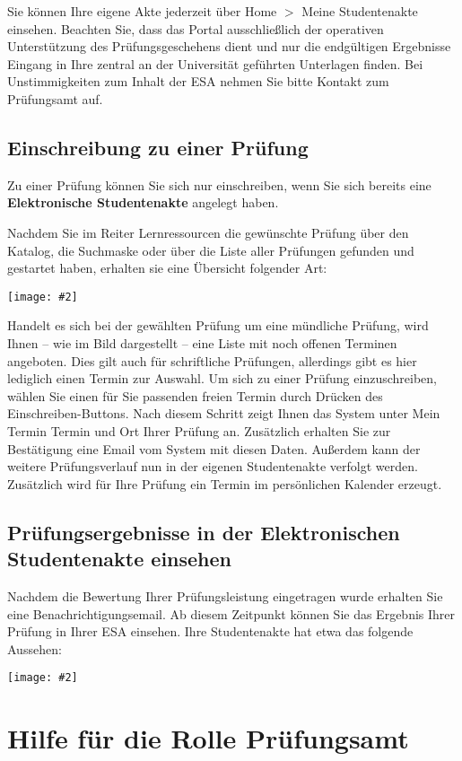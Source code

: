 \documentclass[a4paper,11pt]{article}
\newcommand{\bild}[2]{
    \begin{center}\texttt{[image: \#2]}\end{center}
}
\newcommand{\knopf}[1]{{\sc #1}}
\begin{document}
Sie können Ihre eigene Akte jederzeit über \knopf{Home $>$ Meine Studentenakte}
einsehen. Beachten Sie, dass das Portal ausschließlich der operativen
Unterstützung des Prüfungsgeschehens dient und nur die endgültigen Ergebnisse
Eingang in Ihre zentral an der Universität geführten Unterlagen finden. Bei
Unstimmigkeiten zum Inhalt der ESA nehmen Sie bitte Kontakt zum Prüfungsamt
auf.

\subsection{Einschreibung zu einer Prüfung}

Zu einer Prüfung können Sie sich nur einschreiben, wenn Sie sich bereits eine
{\bf Elektronische Studentenakte} angelegt haben.

Nachdem Sie im Reiter \knopf{Lernressourcen} die gewünschte Prüfung über den
Katalog, die Suchmaske oder über die Liste aller Prüfungen gefunden und
gestartet haben, erhalten sie eine Übersicht folgender Art:

\bild{.9}{Pruefung-Einschreiben}

Handelt es sich bei der gewählten Prüfung um eine mündliche Prüfung, wird
Ihnen -- wie im Bild dargestellt -- eine Liste mit noch offenen Terminen
angeboten.  Dies gilt auch für schriftliche Prüfungen, allerdings gibt es hier
lediglich einen Termin zur Auswahl. Um sich zu einer Prüfung einzuschreiben,
wählen Sie einen für Sie passenden freien Termin durch Drücken des
\knopf{Einschreiben}-Buttons. Nach diesem Schritt zeigt Ihnen das System unter
\knopf{Mein Termin} Termin und Ort Ihrer Prüfung an. Zusätzlich erhalten Sie
zur Bestätigung eine Email vom System mit diesen Daten. Außerdem kann der
weitere Prüfungsverlauf nun in der eigenen Studentenakte verfolgt werden.
Zusätzlich wird für Ihre Prüfung ein Termin im persönlichen Kalender erzeugt.
 
\subsection{Prüfungsergebnisse in der Elektronischen Studentenakte einsehen}

Nachdem die Bewertung Ihrer Prüfungsleistung eingetragen wurde
erhalten Sie eine Benachrichtigungsemail. Ab diesem Zeitpunkt können Sie
das Ergebnis Ihrer Prüfung in Ihrer ESA einsehen.  Ihre Studentenakte hat etwa
das folgende Aussehen:

\bild{.9}{ESA-Ansicht}

\clearpage
\section{Hilfe für die Rolle Prüfungsamt}
\end{document}
